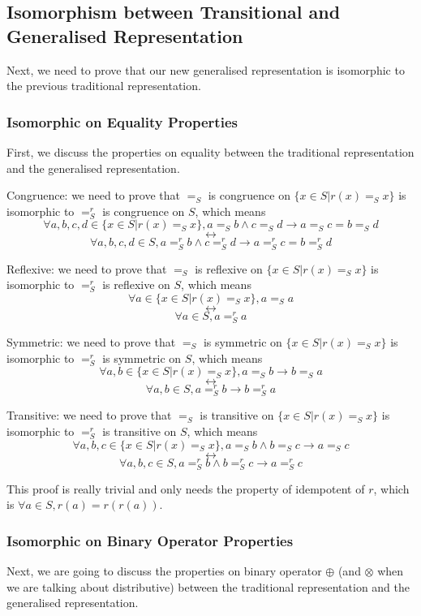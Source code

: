 \documentclass[a4paper,12pt,twoside,openright]{report}
\begin{document}
\subsection{Isomorphism between Transitional and Generalised Representation}
Next, we need to prove that our new generalised representation is isomorphic to the previous traditional representation.

\subsubsection{Isomorphic on Equality Properties}
First, we discuss the properties on equality between the traditional representation and the generalised representation.

Congruence: we need to prove that $=_S$ is congruence on $\{x \in S | r(x) =_S x\}$ is isomorphic to $=^r_S$ is congruence on $S$, which means 
\[\forall a,b,c,d \in \{x \in S | r(x) =_S x \}, a =_S b \wedge c =_S d \rightarrow a =_S c = b =_S d \]
\[\longleftrightarrow \]
\[\forall a,b,c,d \in S, a =^r_S b \wedge c =^r_S d \rightarrow a =^r_S c = b =^r_S d
\]

Reflexive: we need to prove that $=_S$ is reflexive on $\{x \in S | r(x) =_S x \}$ is isomorphic to $=^r_S$ is reflexive on $S$, which means 
\[\forall a \in \{x \in S | r(x) =_S x \}, a =_S a \]
\[\longleftrightarrow \]
\[\forall a \in S, a =^r_S a
\]

Symmetric: we need to prove that $=_S$ is symmetric on $\{x \in S | r(x) =_S x\}$ is isomorphic to $=^r_S$ is symmetric on $S$, which means 
\[\forall a,b \in \{x \in S | r(x) =_S x \}, a =_S b \rightarrow b =_S a \]
\[\longleftrightarrow \]
\[\forall a,b \in S, a =^r_S b \rightarrow b =^r_S a
\]

Transitive: we need to prove that $=_S$ is transitive on $\{x \in S | r(x) =_S x \}$ is isomorphic to $=^r_S$ is transitive on $S$, which means 
\[\forall a,b,c \in \{x \in S | r(x) =_S x \}, a =_S b \wedge b =_S c \rightarrow a =_S c \]
\[\longleftrightarrow \]
\[\forall a,b,c \in S, a =^r_S b \wedge b =^r_S c \rightarrow a =^r_S c
\]

This proof is really trivial and only needs the property of idempotent of $r$, which is $\forall a \in S, r(a) = r(r(a))$. 

\subsubsection{Isomorphic on Binary Operator Properties}
Next, we are going to discuss the properties on binary operator $\oplus$ (and $\otimes$ when we are talking about distributive) between the traditional representation and the generalised representation.
\end{document}
